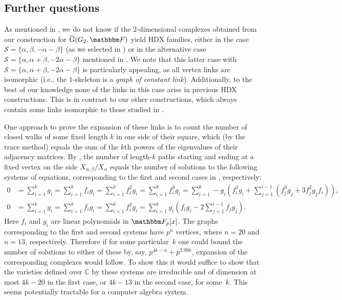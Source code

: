 \documentclass[10pt,a4paper]{article}
\theoremstyle{definition}
\newcommand{\F}{\mathbbm F}
\newcommand{\ol}[1]{\overline{#1}}
\newcommand{\calS}{\mathcal{S}}
\newcommand{\Esc}[2]{\ol{\mathrm{G}}(#1,#2)}
\begin{document}
\subsection{Further questions}  \label{sec:further}
As mentioned in , we do not know if the $2$-dimensional complexes obtained from our construction for $\Esc{G_2}{\F}$ yield HDX families, either in the case  $\calS = \{\alpha, \beta, -\alpha-\beta\}$ (as we selected in ) or in the alternative case $\calS = \{\alpha,\alpha+\beta,-2\alpha-\beta\}$ mentioned in . We note that this latter case with $\calS = \{\alpha,\alpha+\beta,-2\alpha-\beta\}$ is particularly appealing, as all vertex links are isomorphic (i.e., the $1$-skeleton is a \emph{graph of constant link}). Additionally, to the best of our knowledge none of the links in this case arise in previous HDX constructions. This is in contrast to our other constructions, which always contain some links isomorphic to those studied in \cite{KO18}.

One approach to prove the expansion of these links is to count the number of closed walks of some fixed length $k$ in one side of their square, which (by the trace method) equals the sum of the $k$th powers of the eigenvalues of their adjacency matrices. By , the number of length-$k$ paths starting and ending at a fixed vertex on the side $X_{\alpha,\beta}/X_\alpha$ equals the number of solutions to the following systems of equations, corresponding to the first and second cases in , respectively:
\begin{align*}
0 &= \sum_{i=1}^k g_i = \sum_{i=1}^k f_ig_i = \sum_{i=1}^k f_i^2g_i = \sum_{i=1}^k f_i^3g_i=\sum_{i=1}^k -g_i(f_i^3g_i+\sum_{j=1}^{i-1} (f_j^3g_j+3f_j^2g_jf_i)),\\
0 &=\sum_{i=1}^k g_i = \sum_{i=1}^k f_ig_i = \sum_{i=1}^k f_i^2g_i = \sum_{i=1}^k g_i(f_ig_i - 2\sum_{j=1}^{i-1} f_jg_j).
\end{align*}
Here $f_i$ and $g_i$ are linear polynomials in $\F_p[x]$. The graphs corresponding to the first and second systems have $p^n$ vertices, where $n=20$ and $n=13$, respectively. Therefore if for some particular~$k$ one could bound the number of solutions to either of these by, say, $p^{4k-n} + p^{3.99k}$, expansion of the corresponding complexes would follow. To show this it would suffice to show that the varieties defined over $\mathbb{C}$ by these systems are irreducible and of dimension at most $4k-20$ in the first case, or $4k-13$ in the second case, for some~$k$. This seems potentially tractable for a computer algebra system.
\end{document}
